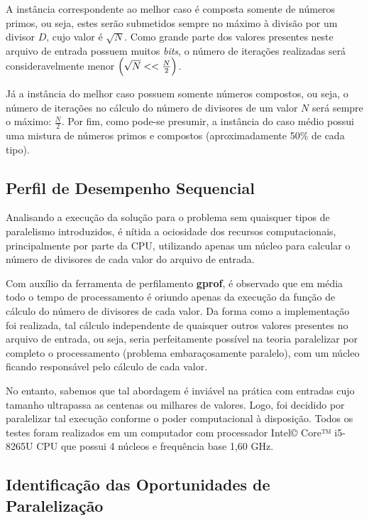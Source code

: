 \documentclass[a4paper, 12pt]{article}
\begin{document}
A instância correspondente ao melhor caso é composta somente de números primos, ou seja, estes serão submetidos sempre no máximo à divisão por um divisor \(D\), cujo valor é \(\sqrt{N}\). Como grande parte dos valores presentes neste arquivo de entrada possuem muitos \emph{bits}, o número de iterações realizadas será consideravelmente menor $\Bigl(\sqrt{N} << \frac{N}{2}\Bigl)$.

Já a instância do melhor caso possuem somente números compostos, ou seja, o número de iterações no cálculo do número de divisores de um valor \(N\) será sempre o máximo: \(\frac{N}{2}\). Por fim, como pode-se presumir, a instância do caso médio possui uma mistura de números primos e compostos (aproximadamente 50\% de cada tipo).

\subsection{Perfil de Desempenho Sequencial}

Analisando a execução da solução para o problema sem quaisquer tipos de paralelismo introduzidos, é nítida a ociosidade dos recursos computacionais, principalmente por parte da CPU, utilizando apenas um núcleo para calcular o número de divisores de cada valor do arquivo de entrada.

Com auxílio da ferramenta de perfilamento \textbf{gprof}\footnotemark, é observado que em média todo o tempo de processamento é oriundo apenas da execução da função de cálculo do número de divisores de cada valor. Da forma como a implementação foi realizada, tal cálculo independente de quaisquer outros valores presentes no arquivo de entrada, ou seja, seria perfeitamente possível na teoria paralelizar por completo o processamento (problema embaraçosamente paralelo), com um núcleo ficando responsável pelo cálculo de cada valor.


No entanto, sabemos que tal abordagem é inviável na prática com entradas cujo tamanho ultrapassa as centenas ou milhares de valores. Logo, foi decidido por paralelizar tal execução conforme o poder computacional à disposição. Todos os testes foram realizados em um computador com processador Intel© Core™ i5-8265U CPU que possui 4 núcleos e frequência base 1,60 GHz.

\subsection{Identificação das Oportunidades de Paralelização}
\end{document}
